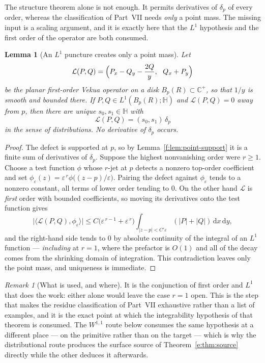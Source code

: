 \documentclass[11pt,a4paper]{article}
\numberwithin{equation}{section}
\newtheorem{lemma}[theorem]{Lemma}
\theoremstyle{definition}
\theoremstyle{remark}
\newtheorem{remark}[theorem]{Remark}
\theoremstyle{plain}
\newcommand{\HH}{\mathbb H}
\newcommand{\CC}{\mathbb C}
\newcommand{\Cplus}{\CC^{+}}
\newcommand{\abs}[1]{\lvert #1\rvert}
\newcommand{\dd}{\mathrm d}
\begin{document}
The structure theorem alone is not enough. It permits derivatives of
$\delta_p$ of every order, whereas the classification of Part~VII needs
\emph{only} a point mass. The missing input is a scaling argument, and it
is exactly here that the $L^1$ hypothesis and the first order of the
operator are both consumed.

\begin{lemma}[An $L^1$ puncture creates only a point mass]
\label{f:lem:defect-scaling}
Let
\[
 \mathcal L(P,Q)=\Bigl(P_x-Q_y-\frac{2Q}{y},\ \ Q_x+P_y\Bigr)
\]
be the planar first-order Vekua operator on a disk
$B_p(R)\subset\Cplus$, so that $1/y$ is smooth and bounded there. If
$P,Q\in L^1(B_p(R);\HH)$ and $\mathcal L(P,Q)=0$ away from $p$, then there
are unique $s_0,s_1\in\HH$ with
\begin{equation}
 \mathcal L(P,Q)=(s_0,s_1)\,\delta_p
 \label{f:eq:defect}
\end{equation}
in the sense of distributions. No derivative of $\delta_p$ occurs.
\end{lemma}
\begin{proof}
The defect is supported at $p$, so by Lemma~\ref{f:lem:point-support} it is
a finite sum of derivatives of $\delta_p$. Suppose the highest nonvanishing
order were $r\ge1$. Choose a test function $\phi$ whose $r$-jet at $p$
detects a nonzero top-order coefficient and set
$\phi_\varepsilon(z)=\varepsilon^{\,r}\phi\bigl((z-p)/\varepsilon\bigr)$.
Pairing the defect against $\phi_\varepsilon$ tends to a nonzero constant,
all terms of lower order tending to $0$. On the other hand $\mathcal L$ is
\emph{first} order with bounded coefficients, so moving its derivatives
onto the test function gives
\[
 \abs{\langle\mathcal L(P,Q),\phi_\varepsilon\rangle}
 \le C\bigl(\varepsilon^{\,r-1}+\varepsilon^{\,r}\bigr)
 \int_{\abs{z-p}<C'\varepsilon}(\abs P+\abs Q)\,\dd x\,\dd y ,
\]
and the right-hand side tends to $0$ by absolute continuity of the integral
of an $L^1$ function --- \emph{including} at $r=1$, where the prefactor is
$O(1)$ and all of the decay comes from the shrinking domain of
integration. This contradiction leaves only the point mass, and uniqueness
is immediate.
\end{proof}

\begin{remark}[What is used, and where]
It is the conjunction of first order and $L^1$ that does the work: either
alone would leave the case $r=1$ open. This is the step that makes the
residue classification of Part~VII exhaustive rather than a list of
examples, and it is the exact point at which the integrability hypothesis
of that theorem is consumed. The $W^{1,1}$ route below consumes the same
hypothesis at a different place --- on the primitive rather than on the
target --- which is why the distributional route produces the surface
source of Theorem~\ref{e:thm:source} directly while the other deduces it
afterwards.
\end{remark}
\end{document}

